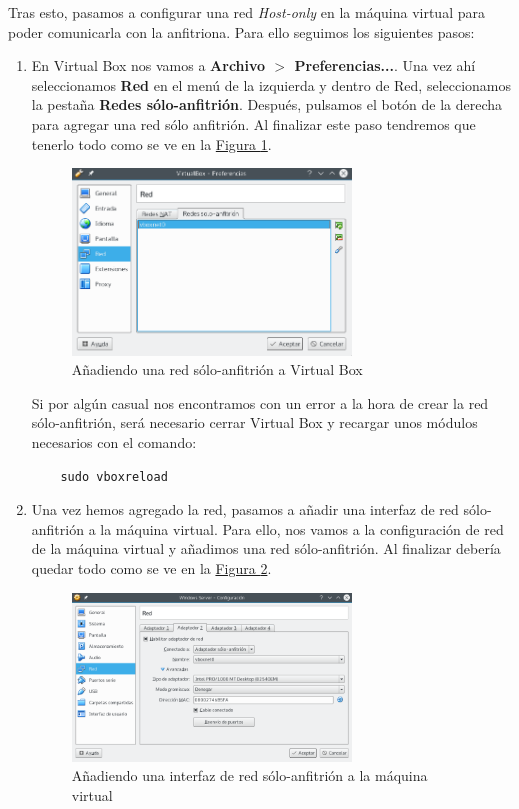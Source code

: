 \documentclass[10pt,a4paper,spanish]{article}
\numberwithin{equation}{section} %
\numberwithin{figure}{section} %
\numberwithin{table}{section} %
\begin{document}
Tras esto, pasamos a configurar una red \textit{Host-only} en la máquina virtual para poder comunicarla con la anfitriona. Para ello seguimos los siguientes pasos:
\begin{enumerate}[1.]
    \item En Virtual Box nos vamos a \textbf{Archivo $>$ Preferencias...}. Una vez ahí seleccionamos \textbf{Red} en el menú de la izquierda y dentro de Red, seleccionamos la pestaña \textbf{Redes sólo-anfitrión}. Después, pulsamos el botón de la derecha para agregar una red sólo anfitrión. Al finalizar este paso tendremos que tenerlo todo como se ve en la \hyperref[paso1]{Figura \ref*{paso1}}.

    \begin{figure}[!h]
        \centering
        \includegraphics[width=0.7\textwidth]{23}
        \caption{Añadiendo una red sólo-anfitrión a Virtual Box}
        \label{paso1}
    \end{figure}

    Si por algún casual nos encontramos con un error a la hora de crear la red sólo-anfitrión, será necesario cerrar Virtual Box y recargar unos módulos necesarios con el comando:
    \begin{verbatim}
    sudo vboxreload
    \end{verbatim}

    \item Una vez hemos agregado la red, pasamos a añadir una interfaz de red sólo-anfitrión a la máquina virtual. Para ello, nos vamos a la configuración de red de la máquina virtual y añadimos una red sólo-anfitrión. Al finalizar debería quedar todo como se ve en la \hyperref[paso2]{Figura \ref*{paso2}}.

    \begin{figure}[!h]
        \centering
        \includegraphics[width=0.7\textwidth]{24}
        \caption{Añadiendo una interfaz de red sólo-anfitrión a la máquina virtual}
        \label{paso2}
    \end{figure}


\end{enumerate}
\end{document}
